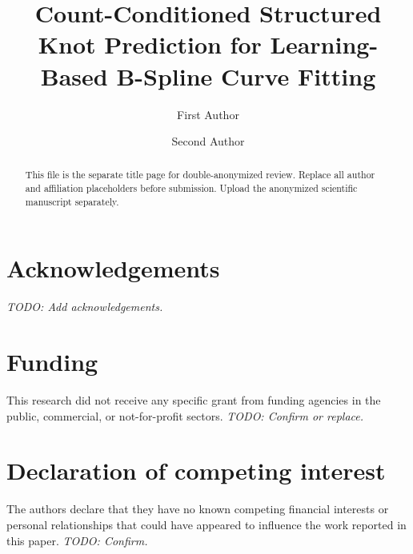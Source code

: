 \documentclass[preprint,12pt]{elsarticle}
\begin{document}
\begin{frontmatter}

\title{Count-Conditioned Structured Knot Prediction for Learning-Based
B-Spline Curve Fitting}

\author[aff1]{First Author}
\author[aff1]{Second Author}

\address[aff1]{Department and Institution, Street address, City, Postal code,
Country}

\begin{abstract}
This file is the separate title page for double-anonymized review. Replace all
author and affiliation placeholders before submission. Upload the anonymized
scientific manuscript separately.
\end{abstract}

\end{frontmatter}

\section*{Acknowledgements}
\textit{TODO: Add acknowledgements.}

\section*{Funding}
This research did not receive any specific grant from funding agencies in the
public, commercial, or not-for-profit sectors. \textit{TODO: Confirm or replace.}

\section*{Declaration of competing interest}
The authors declare that they have no known competing financial interests or
personal relationships that could have appeared to influence the work reported
in this paper. \textit{TODO: Confirm.}
\end{document}
